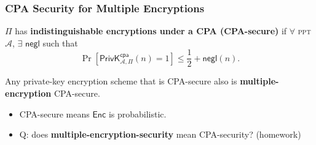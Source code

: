 \begin{frame}\frametitle{CPA Security for Multiple Encryptions}
\begin{definition}\label{def:cap-ind}
$\Pi$ has \textbf{indistinguishable encryptions under a CPA (CPA-secure)} if $\forall$ \textsc{ppt} $\mathcal{A}$, $\exists$ $\mathsf{negl}$ such that
\[ \Pr\left[\mathsf{PrivK}^{\mathsf{cpa}}_{\mathcal{A},\Pi}(n)=1\right] \le \frac{1}{2} + \mathsf{negl}(n).
\]
\end{definition}
\begin{proposition}
Any private-key encryption scheme that is CPA-secure also is \textbf{multiple-encryption} CPA-secure.
\end{proposition}
\begin{itemize}
\item CPA-secure means $\mathsf{Enc}$ is probabilistic.
\item \alert{Q: does \textbf{multiple-encryption-security} mean CPA-security?} (homework)
\end{itemize}
\end{frame}

